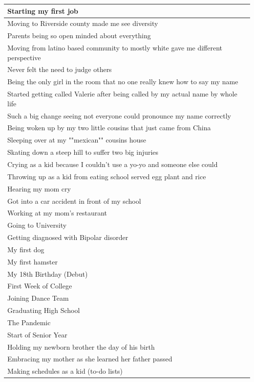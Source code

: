 \documentclass[
  .7em,
  letterpaper,
  DIV=11,
  numbers=noendperiod]{scrartcl}
\begin{document}
\begin{table}
\begin{tabular}{l}
\hline
Starting my first job\\
\hline
Moving to Riverside county made me see diversity\\
\hline
Parents being so open minded about everything\\
\hline
Moving from latino based community to mostly white gave me different perspective\\
\hline
Never felt the need to judge others\\
\hline
Being the only girl in the room that no one really knew how to say my name\\
\hline
Started getting called Valerie after being called by my actual name by whole life\\
\hline
Such a big change seeing not everyone could pronounce my name correctly\\
\hline
Being woken up by my two little cousins that just came from China\\
\hline
Sleeping over at my ""mexican"" cousins house\\
\hline
Skating down a steep hill to suffer two big injuries\\
\hline
Crying as a kid because I couldn't use a yo-yo and someone else could\\
\hline
Throwing up as a kid from eating school served egg plant and rice\\
\hline
Hearing my mom cry\\
\hline
Got into a car accident in front of my school\\
\hline
Working at my mom's restaurant\\
\hline
Going to University\\
\hline
Getting diagnosed with Bipolar disorder\\
\hline
My first dog\\
\hline
My first hamster\\
\hline
My 18th Birthday (Debut)\\
\hline
First Week of College\\
\hline
Joining Dance Team\\
\hline
Graduating High School\\
\hline
The Pandemic\\
\hline
Start of Senior Year\\
\hline
Holding my newborn brother the day of his birth\\
\hline
Embracing my mother as she learned her father passed\\
\hline
Making schedules as a kid (to-do lists)\\

\end{tabular}
\end{table}
\end{document}
